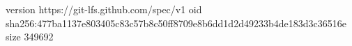 version https://git-lfs.github.com/spec/v1
oid sha256:477ba1137e803405c83c57b8c50ff8709e8b6dd1d2d49233b4de183d3c36516e
size 349692
